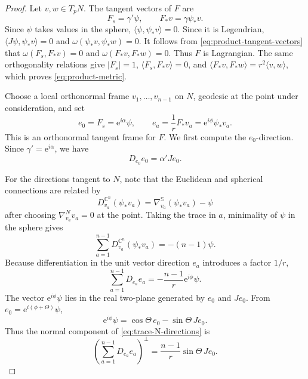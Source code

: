 \documentclass[11pt,a4paper]{article}
\numberwithin{equation}{section}
\newcommand{\C}{\mathbb C}
\newcommand{\Sph}{\mathbb S}
\newcommand{\ee}{\mathrm e}
\begin{document}
\begin{proof}
Let $v,w\in T_pN$. The tangent vectors of $F$ are
\begin{equation}\label{eq:product-tangent-vectors}
F_s=\gamma'\psi,
\qquad
F_*v=\gamma\psi_*v.
\end{equation}
Since $\psi$ takes values in the sphere,
$\langle\psi,\psi_*v\rangle=0$.
Since it is Legendrian,
$\langle J\psi,\psi_*v\rangle=0$
and $\omega(\psi_*v,\psi_*w)=0$.
It follows from \eqref{eq:product-tangent-vectors} that
$\omega(F_s,F_*v)=0$ and
$\omega(F_*v,F_*w)=0$.
Thus $F$ is Lagrangian. The same orthogonality relations give
$|F_s|=1$, $\langle F_s,F_*v\rangle=0$, and
$\langle F_*v,F_*w\rangle=r^2\langle v,w\rangle$,
which proves \eqref{eq:product-metric}.

Choose a local orthonormal frame $v_1,\ldots,v_{n-1}$ on $N$, geodesic at the point under consideration, and set
\begin{equation*}
e_0=F_s=\ee^{i\alpha}\psi,
\qquad
e_a=\frac1rF_*v_a=\ee^{i\phi}\psi_*v_a.
\end{equation*}
This is an orthonormal tangent frame for $F$.
We first compute the $e_0$-direction. Since $\gamma'=\ee^{i\alpha}$,
we have
\begin{equation}\label{eq:D-e0-e0-product}
D_{e_0}e_0=\alpha'Je_0.
\end{equation}

For the directions tangent to $N$, note that the Euclidean and spherical connections are related by
\[
D^{\C^n}_{v_a}(\psi_*v_a)
=\nabla^{\Sph}_{v_a}(\psi_*v_a)-\psi
\]
after choosing $\nabla^N_{v_a}v_a=0$ at the point. Taking the trace in $a$, minimality of $\psi$ in the sphere gives
\begin{equation}
\sum_{a=1}^{n-1}D^{\C^n}_{v_a}(\psi_*v_a)
=-(n-1)\psi.
\end{equation}
Because differentiation in the unit vector direction $e_a$ introduces a factor $1/r$,
\begin{equation}\label{eq:trace-N-directions}
\sum_{a=1}^{n-1}D_{e_a}e_a
=-\frac{n-1}{r}\ee^{i\phi}\psi.
\end{equation}
The vector $\ee^{i\phi}\psi$ lies in the real two-plane generated by $e_0$ and $Je_0$.
From $e_0=\ee^{i(\phi+\Theta)}\psi$,
\begin{equation}
\ee^{i\phi}\psi
=\cos\Theta\,e_0-\sin\Theta\,Je_0.
\end{equation}
Thus the normal component of \eqref{eq:trace-N-directions} is
\begin{equation}\label{eq:normal-trace-N}
\left(\sum_{a=1}^{n-1}D_{e_a}e_a\right)^\perp
=\frac{n-1}{r}\sin\Theta\,Je_0.
\end{equation}


\end{proof}
\end{document}
